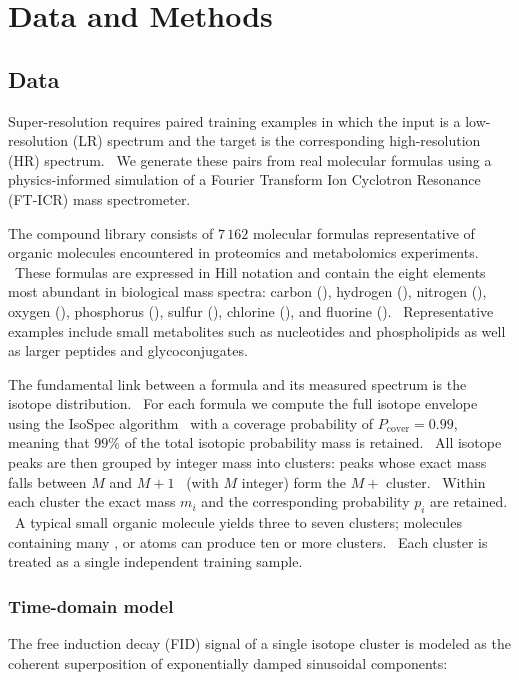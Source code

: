 \documentclass[12pt,a4paper]{report}
\begin{document}
\section{Data and Methods}

\subsection{Data}
\label{sec:data}

Super-resolution requires paired training examples in which the input is a
low-resolution (LR) spectrum and the target is the corresponding high-resolution
(HR) spectrum.  We generate these pairs from real molecular formulas using a
physics-informed simulation of a Fourier Transform Ion Cyclotron Resonance
(FT-ICR) mass spectrometer.

The compound library consists of $7\,162$ molecular formulas representative of
organic molecules encountered in proteomics and metabolomics experiments.  These
formulas are expressed in Hill notation and contain the eight elements most
abundant in biological mass spectra: carbon (), hydrogen (),
nitrogen (), oxygen (), phosphorus (), sulfur (),
chlorine (), and fluorine ().  Representative examples include
small metabolites such as nucleotides and phospholipids as well as larger
peptides and glycoconjugates.

The fundamental link between a formula and its measured spectrum is the isotope
distribution.  For each formula we compute the full isotope envelope using the
IsoSpec algorithm~\cite{isospec} with a coverage probability of
$P_{\mathrm{cover}} = 0.99$, meaning that $99\%$ of the total isotopic
probability mass is retained.  All isotope peaks are then grouped by integer mass
into clusters: peaks whose exact mass falls between $M$ and $M+1$~\ce{} (with
$M$ integer) form the $M+$ cluster.  Within each cluster the exact mass $m_i$
and the corresponding probability $p_i$ are retained.  A typical small organic
molecule yields three to seven clusters; molecules containing many ,
 or  atoms can produce ten or more clusters.  Each cluster is
treated as a single independent training sample.

\subsubsection{Time-domain model}
The free induction decay (FID) signal of a single isotope cluster is modeled as
the coherent superposition of exponentially damped sinusoidal components:
\end{document}

